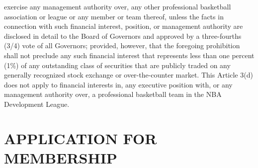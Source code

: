 \documentclass[]{book}
\theoremstyle{definition}
\theoremstyle{definition}
\theoremstyle{definition}
\theoremstyle{remark}
\begin{document}
\begin{enumerate}
  exercise any management authority over, any other professional
  basketball association or league or any member or team thereof, unless
  the facts in connection with such financial interest, position, or
  management authority are disclosed in detail to the Board of Governors
  and approved by a three-fourths (3/4) vote of all Governors; provided,
  however, that the foregoing prohibition shall not preclude any such
  financial interest that represents less than one percent (1\%) of any
  outstanding class of securities that are publicly traded on any
  generally recognized stock exchange or over-the-counter market. This
  Article 3(d) does not apply to financial interests in, any executive
  position with, or any management authority over, a professional
  basketball team in the NBA Development League.
\end{enumerate}

\section{APPLICATION FOR MEMBERSHIP}\label{application-for-membership}
\end{document}
